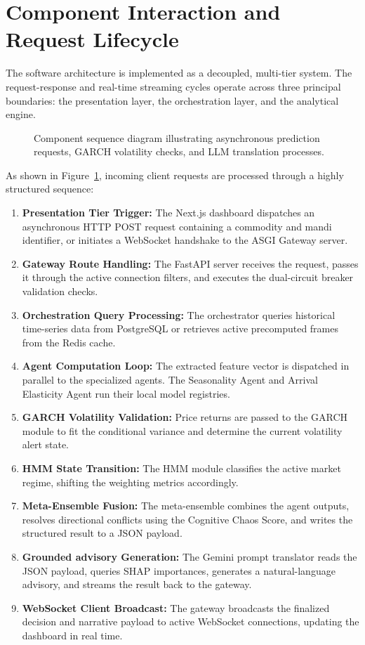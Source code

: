 \documentclass[12pt,a4paper]{report}
\theoremstyle{definition}
\theoremstyle{remark}
\begin{document}
\section{Component Interaction and Request Lifecycle}

The software architecture is implemented as a decoupled, multi-tier system. The request-response and real-time streaming cycles operate across three principal boundaries: the presentation layer, the orchestration layer, and the analytical engine.

\begin{figure}[htbp]
    \centering
    \caption{Component sequence diagram illustrating asynchronous prediction requests, GARCH volatility checks, and LLM translation processes.}
    \label{fig:sequence_diagram}
\end{figure}

As shown in Figure~\ref{fig:sequence_diagram}, incoming client requests are processed through a highly structured sequence:
\begin{enumerate}
    \item \textbf{Presentation Tier Trigger:} The Next.js dashboard dispatches an asynchronous HTTP POST request containing a commodity and mandi identifier, or initiates a WebSocket handshake to the ASGI Gateway server.
    \item \textbf{Gateway Route Handling:} The FastAPI server receives the request, passes it through the active connection filters, and executes the dual-circuit breaker validation checks.
    \item \textbf{Orchestration Query Processing:} The orchestrator queries historical time-series data from PostgreSQL or retrieves active precomputed frames from the Redis cache.
    \item \textbf{Agent Computation Loop:} The extracted feature vector is dispatched in parallel to the specialized agents. The Seasonality Agent and Arrival Elasticity Agent run their local model registries.
    \item \textbf{GARCH Volatility Validation:} Price returns are passed to the GARCH module to fit the conditional variance and determine the current volatility alert state.
    \item \textbf{HMM State Transition:} The HMM module classifies the active market regime, shifting the weighting metrics accordingly.
    \item \textbf{Meta-Ensemble Fusion:} The meta-ensemble combines the agent outputs, resolves directional conflicts using the Cognitive Chaos Score, and writes the structured result to a JSON payload.
    \item \textbf{Grounded advisory Generation:} The Gemini prompt translator reads the JSON payload, queries SHAP importances, generates a natural-language advisory, and streams the result back to the gateway.
    \item \textbf{WebSocket Client Broadcast:} The gateway broadcasts the finalized decision and narrative payload to active WebSocket connections, updating the dashboard in real time.
\end{enumerate}
\end{document}
